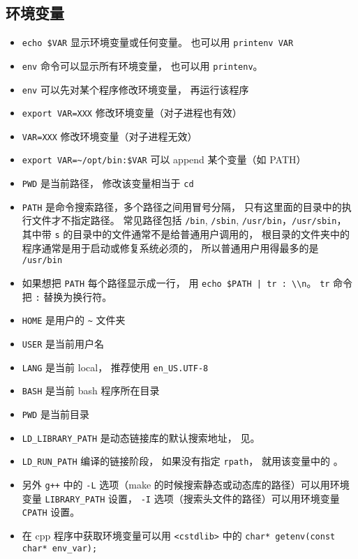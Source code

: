 \subsection{环境变量}
\begin{itemize}
\item \verb`echo $VAR` 显示环境变量或任何变量。 也可以用 \verb`printenv VAR`
\item \verb`env` 命令可以显示所有环境变量， 也可以用 \verb`printenv`。
\item \verb`env` 可以先对某个程序修改环境变量， 再运行该程序
\item \verb`export VAR=XXX` 修改环境变量（对子进程也有效）
\item \verb`VAR=XXX` 修改环境变量（对子进程无效）
\item \verb`export VAR=~/opt/bin:$VAR` 可以 append 某个变量（如 PATH）
\item \verb`PWD` 是当前路径， 修改该变量相当于 \verb`cd`
\item \verb`PATH` 是命令搜索路径，多个路径之间用冒号分隔， 只有这里面的目录中的执行文件才不指定路径。 常见路径包括 \verb`/bin`, \verb`/sbin`, \verb`/usr/bin`，\verb`/usr/sbin`， 其中带 \verb`s` 的目录中的文件通常不是给普通用户调用的， 根目录的文件夹中的程序通常是用于启动或修复系统必须的， 所以普通用户用得最多的是 \verb`/usr/bin`
\item 如果想把 \verb`PATH` 每个路径显示成一行， 用 \verb`echo $PATH | tr : \\n`。 \verb`tr` 命令把 \verb`:` 替换为换行符。
\item \verb`HOME` 是用户的 \verb`~` 文件夹
\item \verb`USER` 是当前用户名
\item \verb`LANG` 是当前 local， 推荐使用 \verb`en_US.UTF-8`
\item \verb`BASH` 是当前 bash 程序所在目录
\item \verb`PWD` 是当前目录
\item \verb`LD_LIBRARY_PATH` 是动态链接库的默认搜索地址， 见。
\item \verb`LD_RUN_PATH` 编译的链接阶段， 如果没有指定 \verb`rpath`， 就用该变量中的 。
\item 另外 \verb`g++` 中的 \verb`-L` 选项（make 的时候搜索静态或动态库的路径）可以用环境变量 \verb`LIBRARY_PATH` 设置， \verb`-I` 选项（搜索头文件的路径）可以用环境变量 \verb`CPATH` 设置。
\item 在 cpp 程序中获取环境变量可以用 \verb`<cstdlib>` 中的 \verb`char* getenv(const char* env_var);`
\end{itemize}

